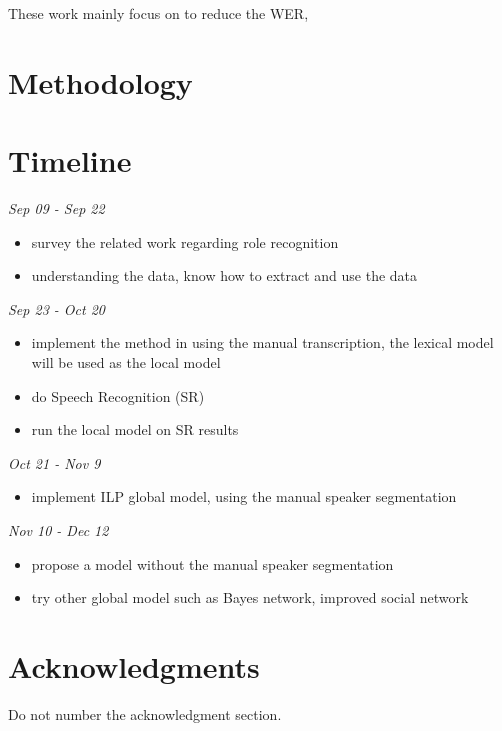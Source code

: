 \documentclass[11pt,letterpaper]{article}
\begin{document}
These work mainly focus on to reduce the WER, 


\section{Methodology}

\section{Timeline}

\noindent \emph{Sep 09 - Sep 22}
\begin{itemize}
  \item survey the related work regarding role recognition
  \item understanding the data, know how to extract and use the data
\end{itemize}

\noindent \emph{Sep 23 -  Oct 20}
\begin{itemize}
  \item implement the method in \cite{Garg:2008} using the manual transcription, the lexical model will be used as the local model
  \item do Speech Recognition (SR)
  \item run the local model on SR results
\end{itemize}

\noindent \emph{Oct 21 - Nov 9}
\begin{itemize}
  \item implement ILP global model, using the manual speaker segmentation
\end{itemize}

\noindent \emph{Nov 10 - Dec 12}
\begin{itemize}
  \item propose a model without the manual speaker segmentation
  \item try other global model such as Bayes network, improved social network
\end{itemize}

\section*{Acknowledgments}

Do not number the acknowledgment section.
\end{document}
